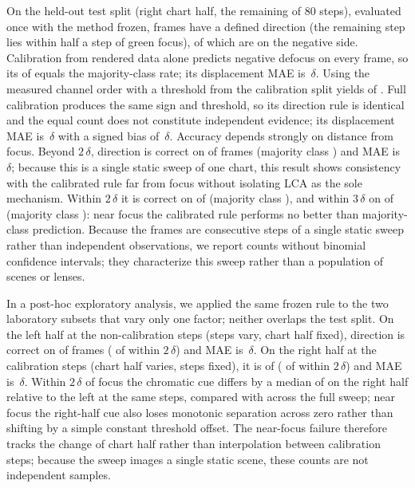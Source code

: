 \documentclass{ieee-ojvt}
\begin{document}
On the held-out test split (right chart half, the remaining \LabTestNsteps{} of 80 steps), evaluated once with the method frozen, \LabTestCalN{} frames have a defined direction (the remaining step lies within half a step of green focus), \LabTestNegN{} of which are on the negative side. Calibration from rendered data alone predicts negative defocus on every frame, so its \LabTestRenderedOk{} of \LabTestRenderedN{} equals the majority-class rate; its displacement MAE is \LabTestRenderedMae\,$\delta$. Using the measured channel order with a threshold from the calibration split yields \LabTestOrderOk{} of \LabTestOrderN{}. Full calibration produces the same sign and threshold, so its direction rule is identical and the equal count does not constitute independent evidence; its displacement MAE is \LabTestCalMae\,$\delta$ with a signed bias of \LabTestCalBias\,$\delta$. Accuracy depends strongly on distance from focus. Beyond $2\,\delta$, direction is correct on \LabBandFarOk{} of \LabBandFarN{} frames (majority class \LabBandFarMaj) and MAE is \LabTestFarMae\,$\delta$; because this is a single static sweep of one chart, this result shows consistency with the calibrated rule far from focus without isolating LCA as the sole mechanism. Within $2\,\delta$ it is correct on \LabBandNearOk{} of \LabBandNearN{} (majority class \LabBandNearMaj), and within $3\,\delta$ on \LabBandNearThreeOk{} of \LabBandNearThreeN{} (majority class \LabBandNearThreeMaj): near focus the calibrated rule performs no better than majority-class prediction. Because the frames are consecutive steps of a single static sweep rather than independent observations, we report counts without binomial confidence intervals; they characterize this sweep rather than a population of scenes or lenses.

In a post-hoc exploratory analysis, we applied the same frozen rule to the two laboratory subsets that vary only one factor; neither overlaps the test split.
On the left half at the non-calibration steps (steps vary, chart half fixed), direction is correct on \LabTrStepsAllOk{} of \LabTrStepsAllN{} frames (\LabTrStepsNearOk{} of \LabTrStepsNearN{} within $2\,\delta$) and MAE is \LabTrStepsMae\,$\delta$.
On the right half at the calibration steps (chart half varies, steps fixed), it is \LabTrHalfAllOk{} of \LabTrHalfAllN{} (\LabTrHalfNearOk{} of \LabTrHalfNearN{} within $2\,\delta$) and MAE is \LabTrHalfMae\,$\delta$.
Within $2\,\delta$ of focus the chromatic cue differs by a median of \LabTrOffsetNear{} on the right half relative to the left at the same steps, compared with \LabTrOffsetAll{} across the full sweep; near focus the right-half cue also loses monotonic separation across zero rather than shifting by a simple constant threshold offset.
The near-focus failure therefore tracks the change of chart half rather than interpolation between calibration steps; because the sweep images a single static scene, these counts are not independent samples.
\end{document}
